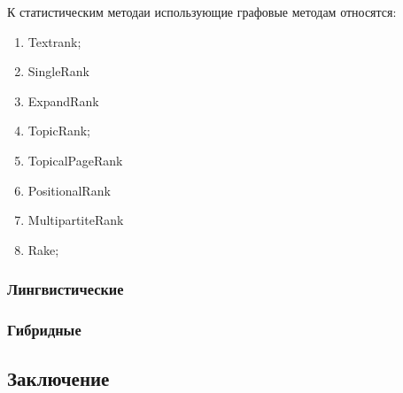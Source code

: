 К статистическим методаи использующие графовые методам относятся:
\begin{enumerate}
	\item Textrank;
	\item SingleRank
	\item ExpandRank
	\item TopicRank;
	\item TopicalPageRank
	\item PositionalRank
	\item MultipartiteRank
	\item Rake;
\end{enumerate}

\subsubsection{Лингвистические}
\subsubsection{Гибридные}
\subsection{Заключение}

